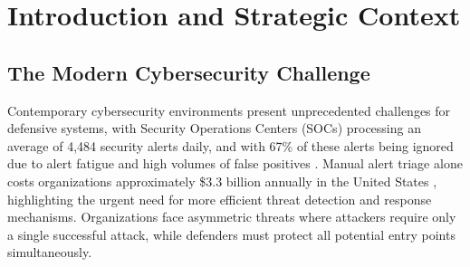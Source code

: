\documentclass[12pt,oneside]{article}
\newcommand{\kwz}[1]{
  {\color{magenta} [KWZ: {#1}]}
 }
\begin{document}

\clearpage

\listoffigures
\clearpage

\listoftables
\clearpage

\setcounter{page}{1}
\pagestyle{fancy}
\fancyhf{}
\fancyfoot[C]{\thepage}


\section{Introduction and Strategic Context}

\subsection{The Modern Cybersecurity Challenge}


Contemporary cybersecurity environments present unprecedented challenges for defensive systems, with Security Operations Centers (SOCs) processing an average of 4,484 security alerts daily, and with 67\% of these alerts being ignored due to alert fatigue and high volumes of false positives \cite{vectra2023threat}. Manual alert triage alone costs organizations approximately \$3.3 billion annually in the United States \cite{vectra2023threat}, highlighting the urgent need for more efficient threat detection and response mechanisms. Organizations face asymmetric threats where attackers require only a single successful attack, while defenders must protect all potential entry points simultaneously. 
\end{document}
